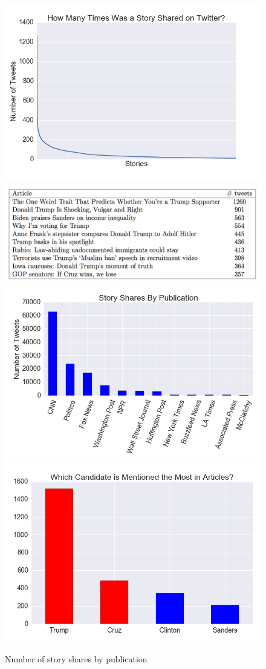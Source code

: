 \documentclass[letterpaper]{article}
\begin{document}
\begin{figure}[t!]
\centering 
  \includegraphics[width=0.8\columnwidth]{story-share-dist}   
  \includegraphics[width=0.8\columnwidth]{top-10-stories} 
  \includegraphics[width=0.8\columnwidth]{all-stories-by-pub} 
  \includegraphics[width=0.8\columnwidth]{candidate-mentions}  
  \caption{Number of story shares by publication
    \label{fig:shares-by-pub}}
\end{figure} 
\end{document}
